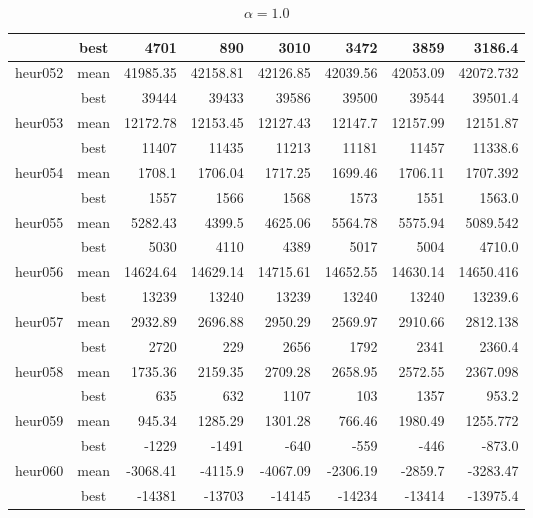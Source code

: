 \documentclass[a4paper,12pt]{article}
\begin{document}
\begin{table}[H]
\begin{tabular}{l|c|r|r|r|r|r|r}
                & best & 4701     & 890      & 3010     & 3472     & 3859     & 3186.4 \\
        \hline
        heur052 & mean & 41985.35 & 42158.81 & 42126.85 & 42039.56 & 42053.09 & 42072.732 \\
                & best & 39444 & 39433 & 39586 & 39500 & 39544 & 39501.4 \\
        \hline
        heur053 & mean & 12172.78 &  12153.45 & 12127.43 & 12147.7 & 12157.99 & 12151.87 \\
                & best & 11407 & 11435 & 11213 & 11181 & 11457 & 11338.6\\
        \hline
        heur054 & mean & 1708.1 & 1706.04 & 1717.25 & 1699.46 & 1706.11 & 1707.392 \\
                & best & 1557 & 1566 & 1568 & 1573 & 1551 & 1563.0\\
        \hline
        heur055 & mean & 5282.43 & 4399.5 & 4625.06 & 5564.78 & 5575.94 & 5089.542 \\
                & best & 5030 & 4110 & 4389 & 5017 & 5004 & 4710.0\\
        \hline
        heur056 & mean & 14624.64 & 14629.14 & 14715.61 & 14652.55 & 14630.14 & 14650.416 \\
                & best & 13239 & 13240 & 13239 & 13240 & 13240 & 13239.6\\
        \hline
        heur057 & mean & 2932.89 & 2696.88 & 2950.29 & 2569.97 & 2910.66 & 2812.138 \\
                & best & 2720 & 229 & 2656 & 1792 & 2341 & 2360.4\\
        \hline
        heur058 & mean & 1735.36 & 2159.35 & 2709.28 & 2658.95 & 2572.55 & 2367.098 \\
                & best & 635 & 632 & 1107 & 103 & 1357 & 953.2 \\
        \hline
        heur059 & mean & 945.34 & 1285.29 & 1301.28 & 766.46 & 1980.49 & 1255.772\\
                & best & -1229 & -1491 & -640 & -559 & -446 & -873.0\\
        \hline
        heur060 & mean & -3068.41 & -4115.9 & -4067.09 & -2306.19 & -2859.7 & -3283.47 \\
                & best & -14381 & -13703 & -14145 & -14234 & -13414 & -13975.4 \\       
                

    \end{tabular}
    \caption{$\alpha = 1.0$}
    \label{tab:my_label}
\end{table}
\end{document}
